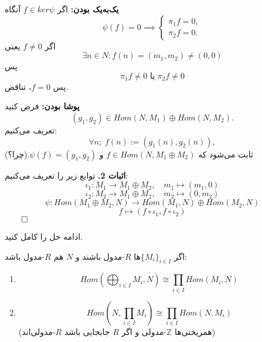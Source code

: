 \begin{frame}
    \textbf{یک‌به‌یک بودن:}
    اگر \( f \in ker \psi \) آنگاه
    \[
        \psi(f) = 0 \implies
        \begin{cases}
            \pi_1 f = 0, \\
            \pi_2 f = 0.
        \end{cases}
    \]
    اگر \( f \neq 0 \) یعنی
    \[
        \exists n \in N : f(n) = (m_1,m_2) \neq (0,0)
    \] پس
    \[
        \pi_1 f \neq 0\text{ یا }\pi_2 f \neq 0
    \]
    پس \( f=0 \)،
    تناقض.


\end{frame}

\begin{frame}

    \textbf{پوشا بودن:}
    فرض کنید
    \[
        (g_1, g_2) \in Hom(N,M_1) \oplus Hom(N,M_2).
    \]
    تعریف می‌کنیم:
    \[
        \forall n; \;f(n) := (g_1(n), g_2(n)),
    \]
    ثابت می‌شود که
    \( f \in Hom(N, M_1 \oplus M_2)\)
    و
    \(\psi(f) = (g_1,g_2)\).(چرا؟)

\end{frame}

\begin{frame}
    \textbf{اثبات 2.}
    توابع زیر را تعریف می‌کنیم:
    \[
        \iota_1 : M_1 \to M_1 \oplus M_2, \quad m_1 \mapsto (m_1, 0)
    \]
    \[
        \iota_2 : M_2 \to M_1 \oplus M_2, \quad m_2 \mapsto (0, m_2)
    \]
    \[
        \psi : Hom(M_1 \oplus M_2, N) \to Hom(M_1,N) \oplus Hom(M_2,N)
    \]
    \[
        f \mapsto (f \circ \iota_1, f \circ \iota_2)
    \]
    \hfill\(\qed\)

    \begin{exercise}
        ادامه حل را کامل کنید.
    \end{exercise}

\end{frame}


\begin{frame}
    \begin{exercise}
        اگر \( \{M_i\}_{i\in I} \)ها \( R \)-مدول باشند و \( N \) هم \( R \)-مدول باشد:
        \begin{enumerate}
            \item
                  \[
                      Hom\left( \bigoplus_{i \in I} M_i, N \right) \cong \prod_{i \in I} Hom(M_i, N)
                  \]
            \item
                  \[
                      Hom\left( N, \prod_{i \in I} M_i \right) \cong \prod_{i \in I} Hom(N, M_i)
                  \]
                  (همریختی‌ها \(\mathbb{Z}\)-مدولی و اگر \( R \) جابجایی باشد \( R \)-مدولی‌اند)
        \end{enumerate}
    \end{exercise}


\end{frame}


